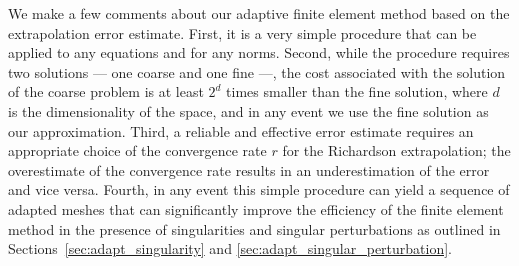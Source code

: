 We make a few comments about our adaptive finite element method based on the extrapolation error estimate.  First, it is a very simple procedure that can be applied to any equations and for any norms. Second, while the procedure requires two solutions --- one coarse and one fine ---, the cost associated with the solution of the coarse problem is at least $2^d$ times smaller than the fine solution, where $d$ is the dimensionality of the space, and in any event we use the fine solution as our approximation.  Third, a reliable and effective error estimate requires an appropriate choice of the convergence rate $r$ for the Richardson extrapolation; the overestimate of the convergence rate results in an underestimation of the error and vice versa.  Fourth, in any event this simple procedure can yield a sequence of adapted meshes that can significantly improve the efficiency of the finite element method in the presence of singularities and singular perturbations as outlined in Sections~\ref{sec:adapt_singularity} and \ref{sec:adapt_singular_perturbation}.





